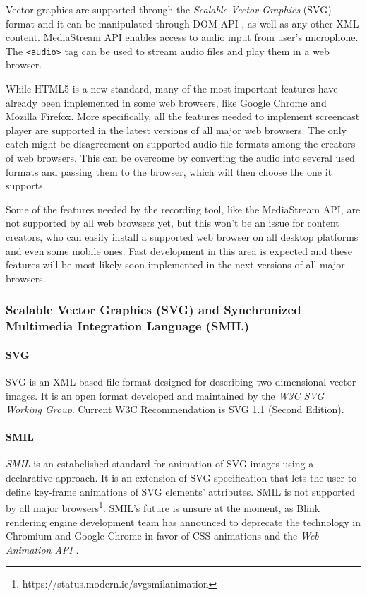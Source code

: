 Vector graphics are supported through the \textit{Scalable Vector Graphics} (SVG) format \cite{svg} and it can be manipulated through DOM API \cite{dom}, as well as any other XML content. MediaStream API \cite{} enables access to audio input from user's microphone. The \verb|<audio>| tag can be used to stream audio files and play them in a web browser.

While HTML5 is a new standard, many of the most important features have already been implemented in some web browsers, like Google Chrome and Mozilla Firefox. More specifically, all the features needed to implement screencast player are supported in the latest versions of all major web browsers. The only catch might be disagreement on supported audio file formats among the creators of web browsers. This can be overcome by converting the audio into several used formats and passing them to the browser, which will then choose the one it supports.

Some of the features needed by the recording tool, like the MediaStream API, are not supported by all web browsers yet, but this won't be an issue for content creators, who can easily install a supported web browser on all desktop platforms and even some mobile ones. Fast development in this area is expected and these features will be most likely soon implemented in the next versions of all major browsers.

\subsubsection*{Scalable Vector Graphics (SVG) and Synchronized Multimedia Integration Language (SMIL)}
\paragraph{SVG} SVG is an XML based file format designed for describing two-dimensional vector images\cite{svg}. It is an open format developed and maintained by the \textit{W3C SVG Working Group}. Current W3C Recommendation is SVG 1.1 (Second Edition).

\paragraph{SMIL} \textit{SMIL} is an estabelished standard for animation of SVG images using a declarative approach. It is an extension of SVG specification that lets the user to define key-frame animations of SVG elements' attributes. SMIL is not supported by all major browsers\footnote{https://status.modern.ie/svgsmilanimation}. SMIL's future is unsure at the moment, as Blink rendering engine development team has announced to deprecate the technology in Chromium and Google Chrome in favor of CSS animations and the \textit{Web Animation API} \cite{blink_no_smil}. 

